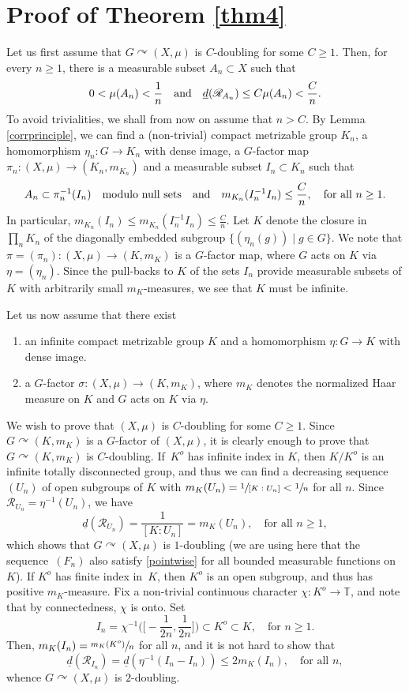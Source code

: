\documentclass[JEP,XML,SOM,Unicode]{cedram}
\let\mathcal\mathscr
\newcommand{\cR}{\mathcal{R}}
\newcommand{\bT}{\mathbb{T}}
\newcommand{\qand}{\quad\textup{and}\quad}
\let\acts\curvearrowright
\theoremstyle{plain}
\theoremstyle{definition}
\begin{document}
\section{Proof of Theorem \ref{thm4}}

Let us first assume that $G \acts (X,\mu)$ is $C$\nobreakdash-doubling for some $C \geq 1$. Then, for every $n \geq 1$, there is
a measurable subset $A_n \subset X$ such that
\[
0 < \mu(A_n) < \frac{1}{n} \qand \underline{d}(\cR_{A_n}) \leq C\mu(A_n) < \frac{C}{n}.
\]
To avoid trivialities, we shall from now on assume that $n > C$. By Lemma \ref{corrprinciple}, we can find a (non-trivial) compact metrizable
group $K_n$, a homomorphism $\eta_n : G \to K_n$ with dense image, a $G$-factor map $\pi_n : (X,\mu) \to (K_n,m_{K_n})$ and
a measurable subset $I_n \subset K_n$ such that
\[
A_n \subset \pi_n^{-1}(I_n) \quad \textrm{modulo null sets} \qand m_{K_n}(I_n^{-1} I_n) \leq \frac{C}{n}, \quad \textrm{for all $n \geq 1$}.
\]
In particular, $m_{K_n}(I_n) \leq m_{K_n}(I_n^{-1} I_n) \leq \frac{C}{n}$. Let $K$ denote the closure in $\prod_n K_n$ of the diagonally embedded
subgroup $\{ (\eta_n(g)) \mid  g \in G\}$. We note that $\pi = (\pi_n) : (X,\mu) \to (K,m_K)$ is a $G$-factor map, where $G$
acts on $K$ via $\eta = (\eta_n)$. Since the pull-backs to $K$ of the sets $I_n$ provide measurable subsets of $K$ with arbitrarily small $m_K$-measures, we see that $K$ must be infinite.

Let us now assume that there exist
\begin{enumerate}
\item
an infinite compact metrizable group $K$ and a homomorphism $\eta : G \to K$ with dense image.
\item
a $G$-factor $\sigma : (X,\mu) \to (K,m_K)$, where $m_K$ denotes the normalized Haar measure on $K$
and $G$ acts on $K$ via $\eta$.
\end{enumerate}
We wish to prove that $(X,\mu)$ is $C$\nobreakdash-doubling for some $C \geq 1$. Since $G \acts (K,m_K)$ is a $G$-factor of $(X,\mu)$, it is clearly
enough to prove that $G \acts (K,m_K)$ is $C$\nobreakdash-doubling. If~$K^o$ has infinite index in $K$, then $K/K^o$ is an infinite totally disconnected group,
and thus we can find a decreasing sequence $(U_n)$ of open subgroups of $K$ with $m_K(U_n) = \sfrac{1}{[K : U_n]} < \sfrac{1}{n}$ for all $n$.
Since $\cR_{U_n} = \eta^{-1}(U_n)$, we have
\[
\underline{d}(\cR_{U_n}) = \frac{1}{[K : U_n]} = m_K(U_n), \quad \textrm{for all $n \geq 1$},
\]
which shows that $G \acts (X,\mu)$ is $1$\nobreakdash-doubling (we are using here that the sequence~$(F_n)$ also satisfy \eqref{pointwise} for all bounded
measurable functions on $K$). If $K^o$ has finite index in~$K$, then $K^o$ is an open subgroup, and thus has
positive $m_K$-measure. Fix a non-trivial continuous character $\chi : K^o \to \bT$, and note that by connectedness, $\chi$ is onto. Set
\[
I_n = \chi^{-1}\Big(\Big[-\frac{1}{2n},\frac{1}{2n}\Big]\Big) \subset K^o \subset K, \quad \textrm{for $n \geq 1$}.
\]
Then, $m_K(I_n) = \sfrac{m_K(K^o)}{n}$ for all $n$, and it is not hard to show that
\[
\underline{d}(\cR_{I_n}) = \underline{d}(\eta^{-1}(I_n - I_n)) \leq 2 m_K(I_n), \quad \textrm{for all $n$},
\]
whence $G \acts (X,\mu)$ is $2$\nobreakdash-doubling.

\backmatter


\end{document}
